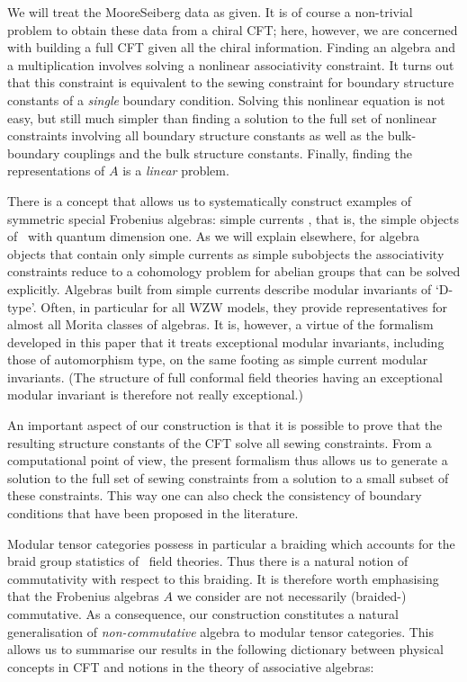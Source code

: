 We will treat the Moore\hy Seiberg data as given. It is of course a 
non-trivial problem to obtain these data from a chiral CFT; here, however, 
we are concerned with building a full CFT given all the chiral information.
Finding an algebra and a multiplication involves solving a 
nonlinear associativity constraint. It turns out that this constraint is 
equivalent to the sewing constraint for boundary structure constants of 
a {\em single\/} boundary condition. Solving this nonlinear equation is 
not easy, but still much simpler 
than finding a solution to the full set of nonlinear constraints involving
all boundary structure constants as well as the bulk-boundary couplings 
and the bulk structure constants. Finally, finding the representations of 
$A$ is a {\em linear\/} problem. 

There is a concept that allows us to systematically construct examples 
of symmetric special Frobenius algebras: simple currents \cite{scya6}, that 
is, the simple objects of \calc\ with quantum dimension one. As we will 
explain elsewhere, for algebra objects that contain only simple currents 
as simple subobjects the associativity constraints reduce to a cohomology 
problem for abelian groups that can be solved explicitly. Algebras built 
from simple currents describe modular invariants of `D-type'. Often,
in particular for all WZW models, they provide representatives for almost 
all Morita classes of algebras. It is, however, a virtue of the formalism 
developed in this paper that it treats exceptional modular invariants,
including those of automorphism type, on the same footing as simple 
current modular invariants. (The structure of full conformal field theories
having an exceptional modular invariant is therefore not really exceptional.)

An important aspect of our construction is that it is possible to prove that 
the resulting structure constants of the CFT solve all sewing constraints. 
{}From a computational point of view, the present formalism thus allows us 
to generate a solution to the full set of sewing constraints from a solution 
to a small subset of these constraints. This way one can also check the 
consistency of boundary conditions that have been proposed in the literature.

\medskip

Modular tensor categories possess in particular a braiding which accounts for 
the braid group statistics of \twodim\ field theories. Thus there is a natural
notion of commutativity with respect to this braiding. It is therefore worth 
emphasising that the Frobenius algebras $A$ we consider are not necessarily 
(braided-) commutative. As a consequence, our construction constitutes a natural 
generalisation of {\em non-commutative\/} algebra to modular tensor categories. 
This allows us to summarise our results in the following dictionary between 
physical concepts in CFT and notions in the theory of associative algebras:


